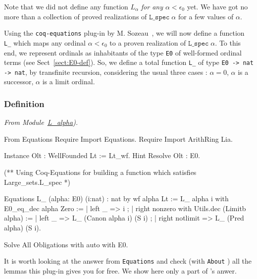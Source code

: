 Note that we did not define any function $L_\alpha$ \emph{for any $\alpha<\epsilon_0$} yet. We have got no more than a collection of proved realizations of $\texttt{L\_spec}\;\alpha$ for a few values of $\alpha$.


Using the \texttt{coq-equations} plug-in by 
M. Sozeau~\cite{sozeau:hal-01671777}, we will now define a function \texttt{L\_} which maps any ordinal  $\alpha<\epsilon_0$ to a proven realization of 
$\texttt{L\_spec}\;\alpha$.   
To this end, we represent ordinals as inhabitants of the type 
\texttt{E0} of well-formed ordinal terms (see Sect~\vref{sect:E0-def}). So, we define a total function \texttt{L\_} of type
\texttt{E0 -> nat -> nat}, by transfinite recursion, considering the usual three cases : $\alpha=0$, $\alpha$ is a successor, $\alpha$ is a limit ordinal.
 

\subsubsection{Definition}



\vspace{4pt}
\noindent
\emph{From Module~\href{../theories/html/hydras.Epsilon0.L_alpha.html\#L_}{L\_alpha}).}

\label{Functions:L-alpha}
\begin{Coqsrc}
From Equations Require Import Equations.
Require Import ArithRing Lia.

Instance Olt : WellFounded Lt := Lt_wf.
Hint Resolve Olt : E0.

(** Using Coq-Equations for building a function which satisfies 
    Large_sets.L_spec *)

Equations  L_ (alpha: E0) (i:nat) :  nat  by wf  alpha Lt :=
  L_ alpha  i with E0_eq_dec alpha Zero :=
    { | left _ =>  i ;
      | right nonzero
          with Utils.dec (Limitb alpha) :=
          { | left _ =>  L_ (Canon alpha i)  (S i) ;
            | right notlimit =>  L_ (Pred alpha) (S i)}}.

Solve All Obligations with auto with E0.
\end{Coqsrc}

It is worth looking at the answer from \texttt{Equations} and check (with \texttt{About} ) all the lemmas this plug-in gives you for free. We show here only a part of \coq's anwer.


